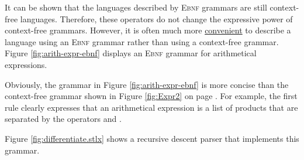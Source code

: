 It can be shown that the languages described by \textsc{Ebnf} grammars are still context-free
languages.  Therefore, these operators do not change the expressive power of context-free 
grammars. 
However, it is often much more \underline{convenient} to describe a language using an \textsc{Ebnf}
grammar rather than using a context-free grammar.  Figure \ref{fig:arith-expr-ebnf}
displays an \textsc{Ebnf} grammar for arithmetical expressions.  

Obviously, the grammar in Figure \ref{fig:arith-expr-ebnf}  is
more concise than the context-free grammar shown in Figure \ref{fig:Expr2} on page \pageref{fig:Expr2}.
For example, the first rule clearly expresses that an arithmetical expression is a list of
products that are separated by the operators \squoted{+} and \squoted{-}.

\noindent
Figure \ref{fig:differentiate.stlx} shows a recursive descent parser that implements this grammar.

